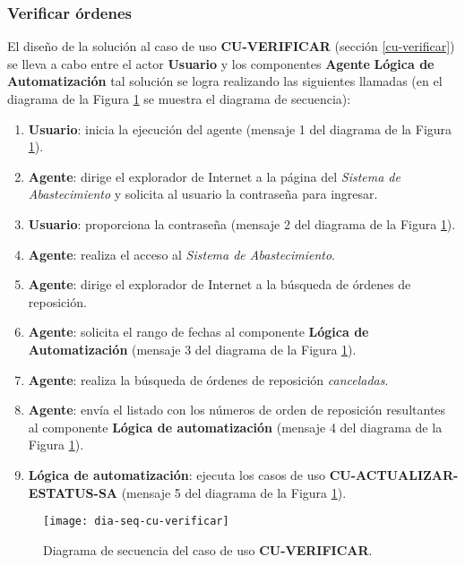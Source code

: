 \subsubsection{Verificar órdenes}
El diseño de la solución al caso de uso \textbf{CU-VERIFICAR} (sección \ref{cu-verificar}) se lleva a cabo entre el actor \textbf{Usuario} y los componentes \textbf{Agente} \textbf{Lógica de Automatización} tal solución se logra realizando las siguientes llamadas (en el diagrama de la Figura \ref{fig:dia-seq-cu-verificar} se muestra el diagrama de secuencia):
\begin{enumerate}
	\item \textbf{Usuario}: inicia la ejecución del agente (mensaje 1 del diagrama de la Figura \ref{fig:dia-seq-cu-verificar}).
	\item \textbf{Agente}: dirige el explorador de Internet a la página del \textit{Sistema de Abastecimiento} y solicita al usuario la contraseña para ingresar.
	\item \textbf{Usuario}: proporciona la contraseña (mensaje 2 del diagrama de la Figura \ref{fig:dia-seq-cu-verificar}).
	\item \textbf{Agente}: realiza el acceso al \textit{Sistema de Abastecimiento}.
	\item \textbf{Agente}: dirige el explorador de Internet a la búsqueda de órdenes de reposición.
	\item \textbf{Agente}: solicita el rango de fechas al componente \textbf{Lógica de Automatización} (mensaje 3 del diagrama de la Figura \ref{fig:dia-seq-cu-verificar}).
	\item \textbf{Agente}: realiza la búsqueda de órdenes de reposición \textit{canceladas}.
	\item \textbf{Agente}: envía el listado con los números de orden de reposición resultantes al componente \textbf{Lógica de automatización} (mensaje 4 del diagrama de la Figura \ref{fig:dia-seq-cu-verificar}).
	\item \textbf{Lógica de automatización}: ejecuta los casos de uso \textbf{CU-ACTUALIZAR-ESTATUS-SA} (mensaje 5 del diagrama de la Figura \ref{fig:dia-seq-cu-verificar}).
\end{enumerate}

\begin{figure}[h]
	\centering
	\texttt{[image: dia-seq-cu-verificar]}
	\caption{Diagrama de secuencia del caso de uso \textbf{CU-VERIFICAR}.}
	\label{fig:dia-seq-cu-verificar}
\end{figure}

